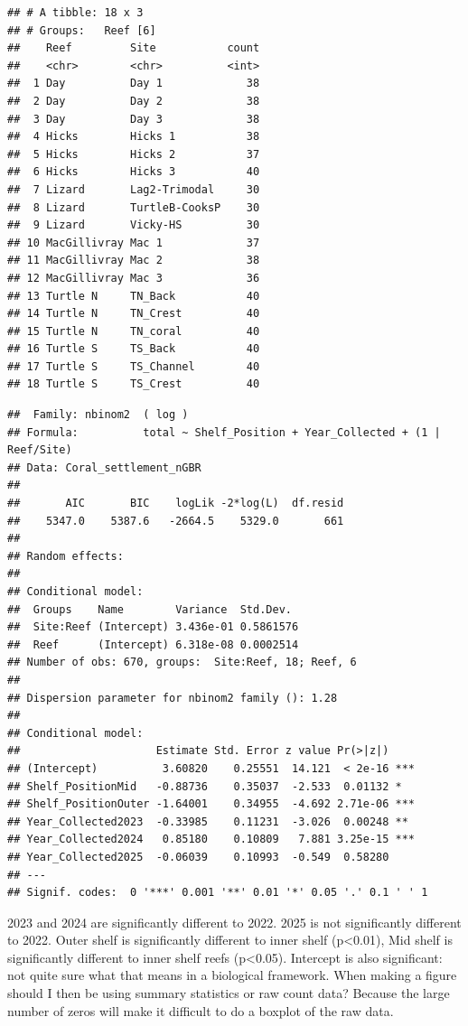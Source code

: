 \documentclass[
]{article}
\begin{document}
\begin{verbatim}
## # A tibble: 18 x 3
## # Groups:   Reef [6]
##    Reef         Site           count
##    <chr>        <chr>          <int>
##  1 Day          Day 1             38
##  2 Day          Day 2             38
##  3 Day          Day 3             38
##  4 Hicks        Hicks 1           38
##  5 Hicks        Hicks 2           37
##  6 Hicks        Hicks 3           40
##  7 Lizard       Lag2-Trimodal     30
##  8 Lizard       TurtleB-CooksP    30
##  9 Lizard       Vicky-HS          30
## 10 MacGillivray Mac 1             37
## 11 MacGillivray Mac 2             38
## 12 MacGillivray Mac 3             36
## 13 Turtle N     TN_Back           40
## 14 Turtle N     TN_Crest          40
## 15 Turtle N     TN_coral          40
## 16 Turtle S     TS_Back           40
## 17 Turtle S     TS_Channel        40
## 18 Turtle S     TS_Crest          40
\end{verbatim}

\begin{verbatim}
##  Family: nbinom2  ( log )
## Formula:          total ~ Shelf_Position + Year_Collected + (1 | Reef/Site)
## Data: Coral_settlement_nGBR
## 
##       AIC       BIC    logLik -2*log(L)  df.resid 
##    5347.0    5387.6   -2664.5    5329.0       661 
## 
## Random effects:
## 
## Conditional model:
##  Groups    Name        Variance  Std.Dev. 
##  Site:Reef (Intercept) 3.436e-01 0.5861576
##  Reef      (Intercept) 6.318e-08 0.0002514
## Number of obs: 670, groups:  Site:Reef, 18; Reef, 6
## 
## Dispersion parameter for nbinom2 family (): 1.28 
## 
## Conditional model:
##                     Estimate Std. Error z value Pr(>|z|)    
## (Intercept)          3.60820    0.25551  14.121  < 2e-16 ***
## Shelf_PositionMid   -0.88736    0.35037  -2.533  0.01132 *  
## Shelf_PositionOuter -1.64001    0.34955  -4.692 2.71e-06 ***
## Year_Collected2023  -0.33985    0.11231  -3.026  0.00248 ** 
## Year_Collected2024   0.85180    0.10809   7.881 3.25e-15 ***
## Year_Collected2025  -0.06039    0.10993  -0.549  0.58280    
## ---
## Signif. codes:  0 '***' 0.001 '**' 0.01 '*' 0.05 '.' 0.1 ' ' 1
\end{verbatim}

2023 and 2024 are significantly different to 2022. 2025 is not
significantly different to 2022. Outer shelf is significantly different
to inner shelf (p\textless0.01), Mid shelf is significantly different to
inner shelf reefs (p\textless0.05). Intercept is also significant: not
quite sure what that means in a biological framework. When making a
figure should I then be using summary statistics or raw count data?
Because the large number of zeros will make it difficult to do a boxplot
of the raw data.
\end{document}
